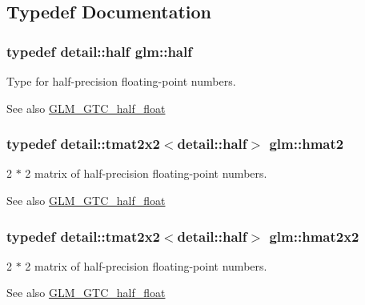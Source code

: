 \subsection{Typedef Documentation}
\hypertarget{group__gtc__half__float_gadae4de950aa2230455634615b782c151}{}
\subsubsection[{half}]{\setlength{\rightskip}{0pt plus 5cm}typedef detail\+::half {\bf glm\+::half}}\label{group__gtc__half__float_gadae4de950aa2230455634615b782c151}
Type for half-\/precision floating-\/point numbers. \begin{DoxySeeAlso}{See also}
\hyperlink{group__gtc__half__float}{G\+L\+M\+\_\+\+G\+T\+C\+\_\+half\+\_\+float} 
\end{DoxySeeAlso}
\hypertarget{group__gtc__half__float_gaf5adf0fe534e1e97f0f162805c1a4dba}{}
\subsubsection[{hmat2}]{\setlength{\rightskip}{0pt plus 5cm}typedef detail\+::tmat2x2$<$detail\+::half$>$ {\bf glm\+::hmat2}}\label{group__gtc__half__float_gaf5adf0fe534e1e97f0f162805c1a4dba}
2 $\ast$ 2 matrix of half-\/precision floating-\/point numbers. \begin{DoxySeeAlso}{See also}
\hyperlink{group__gtc__half__float}{G\+L\+M\+\_\+\+G\+T\+C\+\_\+half\+\_\+float} 
\end{DoxySeeAlso}
\hypertarget{group__gtc__half__float_ga8de844783e98b26f2d0f1be5dced0d43}{}
\subsubsection[{hmat2x2}]{\setlength{\rightskip}{0pt plus 5cm}typedef detail\+::tmat2x2$<$detail\+::half$>$ {\bf glm\+::hmat2x2}}\label{group__gtc__half__float_ga8de844783e98b26f2d0f1be5dced0d43}
2 $\ast$ 2 matrix of half-\/precision floating-\/point numbers. \begin{DoxySeeAlso}{See also}
\hyperlink{group__gtc__half__float}{G\+L\+M\+\_\+\+G\+T\+C\+\_\+half\+\_\+float} 
\end{DoxySeeAlso}
\hypertarget{group__gtc__half__float_ga620d92d90c323bb52a5a3c4df9b44bda}{}
